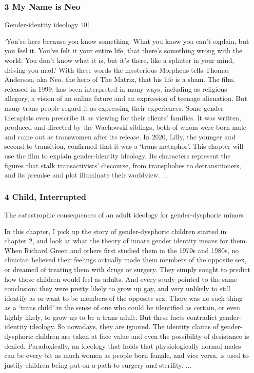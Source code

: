 \documentclass[10pt,titlepage]{book}
\begin{document}
\subsubsection{3 My Name is Neo}

Gender-identity ideology 101

‘You’re here because you know something. What you know you can’t explain, but you feel it. You’ve felt it your entire life, that there’s something wrong with the world. You don’t know what it is, but it’s there, like a splinter in your mind, driving you mad.’ With these words the mysterious Morpheus tells Thomas Anderson, aka Neo, the hero of The Matrix, that his life is a sham. The film, released in 1999, has been interpreted in many ways, including as religious allegory, a vision of an online future and an expression of teenage alienation. But many trans people regard it as expressing their experiences. Some gender therapists even prescribe it as viewing for their clients’ families. It was written, produced and directed by the Wachowski siblings, both of whom were born male and came out as transwomen after its release. In 2020, Lilly, the younger and second to transition, confirmed that it was a ‘trans metaphor’. This chapter will use the film to explain gender-identity ideology. Its characters represent the figures that stalk transactivists’ discourse, from transphobes to detransitioners, and its premise and plot illuminate their worldview.
...

\subsubsection{4 Child, Interrupted}

The catastrophic consequences of an adult ideology for gender-dysphoric minors

In this chapter, I pick up the story of gender-dysphoric children started in chapter 2, and look at what the theory of innate gender identity means for them. When Richard Green and others first studied them in the 1970s and 1980s, no clinician believed their feelings actually made them members of the opposite sex, or dreamed of treating them with drugs or surgery. They simply sought to predict how those children would feel as adults. And every study pointed to the same conclusion: they were pretty likely to grow up gay, and very unlikely to still identify as or want to be members of the opposite sex. There was no such thing as a ‘trans child’ in the sense of one who could be identified as certain, or even highly likely, to grow up to be a trans adult. But these facts contradict gender-identity ideology. So nowadays, they are ignored. The identity claims of gender-dysphoric children are taken at face value and even the possibility of desistance is denied. Paradoxically, an ideology that holds that physiologically normal males can be every bit as much women as people born female, and vice versa, is used to justify children being put on a path to surgery and sterility.
...
\end{document}
